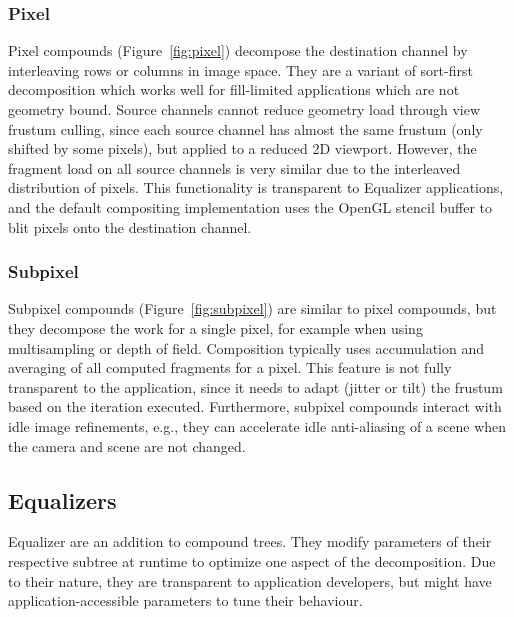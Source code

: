 \documentclass[10pt,journal,compsoc]{IEEEtran}
\newcommand{\fig}[1]{Figure~\ref{#1}}
\begin{document}
\subsubsection{Pixel}

Pixel compounds (\fig{fig:pixel}) decompose the destination channel by
interleaving rows or columns in image space. They are a variant of sort-first
decomposition which works well for fill-limited applications which are not
geometry bound. Source channels cannot reduce geometry load through view frustum
culling, since each source channel has almost the same frustum (only shifted by
some pixels), but applied to a reduced 2D viewport. However, the fragment load
on all source channels is very similar due to the interleaved distribution of
pixels. This functionality is transparent to Equalizer applications, and the
default compositing implementation uses the OpenGL stencil buffer to blit pixels
onto the destination channel.

\subsubsection{Subpixel}

Subpixel compounds (\fig{fig:subpixel}) are similar to pixel compounds, but they
decompose the work for a single pixel, for example when using multisampling or
depth of field. Composition typically uses accumulation and averaging of all
computed fragments for a pixel. This feature is not fully transparent to the
application, since it needs to adapt (jitter or tilt) the frustum based on the
iteration executed. Furthermore, subpixel compounds interact with idle image
refinements, e.g., they can accelerate idle anti-aliasing of a scene when the
camera and scene are not changed.

\subsection{Equalizers}

Equalizer are an addition to compound trees. They modify parameters of their
respective subtree at runtime to optimize one aspect of the decomposition. Due
to their nature, they are transparent to application developers, but might have
application-accessible parameters to tune their behaviour.
\end{document}
